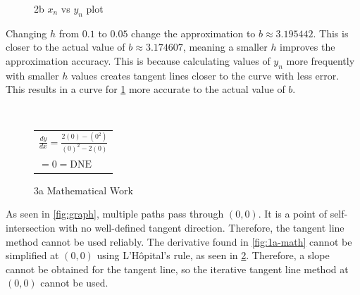 \documentclass[answers,addpoints]{exam}
\begin{document}
\begin{questions}
\begin{solution}
    \begin{figure}[H]
      \centering
      \caption{2b $x_n$ vs $y_n$ plot}
      \label{fig:2b-plot}
    \end{figure}

    Changing $h$ from $0.1$ to $0.05$ change the approximation to $b \approx 3.195442$. This is closer to the actual value of $b \approx 3.174607$, meaning a smaller $h$ improves the approximation accuracy. This is because calculating values of $y_n$ more frequently with smaller $h$ values creates tangent lines closer to the curve with less error. This results in a curve for \ref{fig:2b-plot} more accurate to the actual value of $b$.

  \end{solution}

  \question \
  \begin{solution}

    \begin{figure}[H]
      \centering
      \begin{tabular}{@{}l@{}}
        $\displaystyle \frac{dy}{dx}=\frac{2(0)-(0^2)}{(0)^2-2(0)}$ \\[6pt]
        $\displaystyle =0=\text{DNE}$ \\[6pt]
      \end{tabular}
      \caption{3a Mathematical Work}
      \label{fig:3a-math}
    \end{figure}

    As seen in \ref{fig:graph}, multiple paths pass through $(0,0)$. It is a point of self-intersection with no well-defined tangent direction. Therefore, the tangent line method cannot be used reliably. The derivative found in \ref{fig:1a-math} cannot be simplified at $(0,0)$ using L'Hôpital's rule, as seen in \ref{fig:3a-math}. Therefore, a slope cannot be obtained for the tangent line, so the iterative tangent line method at $(0,0)$ cannot be used.


\end{solution}
\end{questions}
\end{document}
